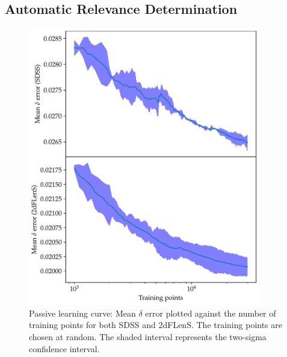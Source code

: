\documentclass[11pt,twoside,openright]{report}
\begin{document}
\subsection{Automatic Relevance Determination}
  \begin{figure}
    \centering
    \includegraphics[width=0.9\textwidth]{passive_delta.pdf}
    \caption{Passive learning curve: Mean $\delta$ error plotted against the number of training points for both SDSS and 2dFLenS. The training points are chosen at random. The shaded interval represents the two-sigma confidence interval.}
    \label{fig:passive_delta}
  \end{figure}
\end{document}
